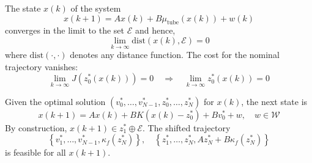 The state $x(k)$ of the system
\begin{equation*}
    x(k + 1) = A x(k) + B \mu_{\text{tube}}(x(k)) + w(k)
\end{equation*}
converges in the limit to the set $\mathcal{E}$ and hence,
\begin{equation*}
    \lim_{k \to \infty} \text{dist}(x(k), \mathcal{E}) = 0
\end{equation*}
where $\text{dist}(\cdot, \cdot)$ denotes any distance function.
\newpar{}
The cost for the nominal trajectory vanishes:
\begin{equation*}
    \lim_{k \to \infty} J(z_0^*(x(k))) = 0 \quad \Rightarrow \quad \lim_{k \to \infty} z_0^*(x(k)) = 0
\end{equation*}

\begin{examplesection}
    \newpar{}

    Given the optimal solution $\left( v_0^*, \dots, v_{N-1}^*, z_0^*, \dots, z_N^* \right)$ for $x(k)$, the next state is
    \begin{equation*}
        x(k + 1) = A x(k) + B K(x(k) - z_0^*) + B v_0^* + w, \quad w \in \mathcal{W}
    \end{equation*}
    By construction, $x(k + 1) \in z_1^* \oplus \mathcal{E}$. The shifted trajectory
    \begin{equation*}
        \left\{ v_1^*, \dots, v_{N-1}^*, \kappa_f(z_N^*) \right\}, \quad \left\{ z_1^*, \dots, z_N^*, A z_N^* + B \kappa_f(z_N^*) \right\}
    \end{equation*}
    is feasible for all $x(k+1)$.


\end{examplesection}
